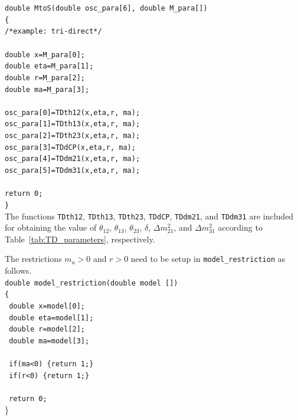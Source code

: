 \documentclass[aps,prd,nofootinbib,preprint]{revtex4}
\begin{document}
\texttt{double MtoS(double osc\_para[6], double M\_para[])}\\
\texttt{\{}\\
    \texttt{/*example: tri-direct*/}\\
\\    
    \texttt{double x=M\_para[0];}\\
    \texttt{double eta=M\_para[1];}\\
    \texttt{double r=M\_para[2];}\\
    \texttt{double ma=M\_para[3];}\\
\\  
    \texttt{osc\_para[0]=TDth12(x,eta,r, ma);}\\
    \texttt{osc\_para[1]=TDth13(x,eta,r, ma);}\\
    \texttt{osc\_para[2]=TDth23(x,eta,r, ma);}\\
    \texttt{osc\_para[3]=TDdCP(x,eta,r, ma);}\\
    \texttt{osc\_para[4]=TDdm21(x,eta,r, ma);}\\
    \texttt{osc\_para[5]=TDdm31(x,eta,r, ma);}\\
\\    
    \texttt{return 0;}\\
\texttt{\}}\\



The functions \texttt{TDth12}, \texttt{TDth13}, \texttt{TDth23}, \texttt{TDdCP}, \texttt{TDdm21}, and \texttt{TDdm31} are included for obtaining the value of $\theta_{12}$, $\theta_{13}$, $\theta_{23}$, $\delta$, $\Delta m_{21}^2$, and $\Delta m_{31}^2$ according to Table~\ref{tab:TD_parameters}, respectively.

The restrictions $m_a>0$ and $r>0$ need to be setup in \texttt{model\_restriction} as follows.\vspace{0.2cm}\\
\texttt{double model\_restriction(double model [])}\\
\texttt{\{}\\
\texttt{    double x=model[0];}\\
\texttt{    double eta=model[1];}\\
\texttt{    double r=model[2];}\\
\texttt{    double ma=model[3];}\\
    \\
\texttt{    if(ma<0) \{return 1;\}}\\
\texttt{    if(r<0) \{return 1;\}}\\
\\ 
\texttt{    return 0;}\\
\}\vspace{0.2cm}\\
\end{document}
